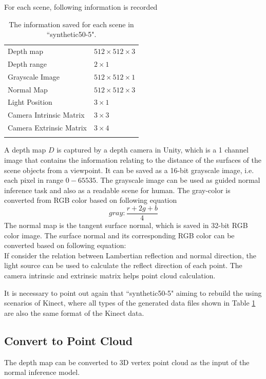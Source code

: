 For each scene, following information is recorded
\begin{table}
	\caption{The information saved for each scene in ``synthetic50-5".}
	\label{tab:data-files}
	\centering
	\begin{tabular}{l l}
		\toprule
		\tabhead{Data} & \tabhead{Size} \\
		\midrule
		Depth map & $ 512\times512\times3 $ \\
		\hline 
		Depth range  & $ 2\times1 $ \\  
		\hline
		Grayscale Image	& $ 512\times512\times1 $ \\  
		\hline 
		Normal Map &  $ 512\times512\times3 $  \\
		\hline 
		Light Position &  $ 3\times1 $  \\
		\hline
		Camera Intrinsic Matrix &  $ 3\times 3 $  \\
		\hline 
		Camera Extrinsic Matrix &  $ 3\times 4 $  \\
		\hline 
		\bottomrule\\
	\end{tabular}
\end{table}

A depth map $ D $ is captured by a depth camera in Unity, which is a 1 channel image that contains the information relating to the distance of the surfaces of the scene objects from a viewpoint. It can be saved as a 16-bit grayscale image, i.e. each pixel in range $0 - 65535$. The grayscale image can be used as guided normal inference task and also as a readable scene for human. The gray-color is converted from RGB color based on following equation 
\[ gray: \frac{r+2g+b}{4}  \]
The normal map is the tangent surface normal, which is saved in 32-bit RGB color image. The surface normal and its corresponding RGB color can be converted based on following equation:
\[  \]
If consider the relation between Lambertian reflection and normal direction, the light source can be used to calculate the reflect direction of each point.
The camera intrinsic and extrinsic matrix helps point cloud calculation.

It is necessary to point out again that ``synthetic50-5" aiming to rebuild the using scenarios of Kinect, where all types of the generated data files shown in Table \ref{tab:data-files} are also the same format of the Kinect data.





\subsection{Convert to Point Cloud}
\label{sec:depth-map-to-point-cloud}
The depth map can be converted to 3D vertex point cloud as the input of the normal inference model. 




